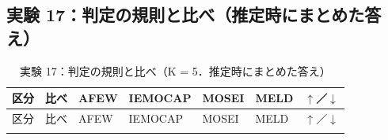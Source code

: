 \subsection*{実験 17：判定の規則と比べ（推定時にまとめた答え）}
\begin{longtable}{>{\raggedright}p{0.75cm}>{\raggedright}p{5.6cm}>{\raggedright}p{2.05cm}>{\raggedright}p{2.05cm}>{\raggedright}p{2.05cm}>{\raggedright}p{2.05cm}p{0.75cm}}
\caption{実験 17：判定の規則と比べ（K = 5．推定時にまとめた答え）}\\
\toprule
区分 & 比べ & AFEW & IEMOCAP & MOSEI & MELD & $\uparrow$／$\downarrow$ \\
\midrule
\endfirsthead
\toprule
区分 & 比べ & AFEW & IEMOCAP & MOSEI & MELD & $\uparrow$／$\downarrow$ \\
\midrule
\endhead
\bottomrule
\endfoot


\end{longtable}
